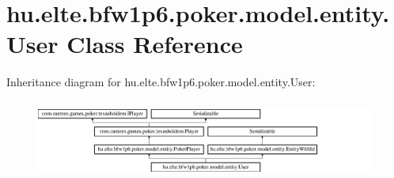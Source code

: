 \hypertarget{classhu_1_1elte_1_1bfw1p6_1_1poker_1_1model_1_1entity_1_1_user}{}\section{hu.\+elte.\+bfw1p6.\+poker.\+model.\+entity.\+User Class Reference}
\label{classhu_1_1elte_1_1bfw1p6_1_1poker_1_1model_1_1entity_1_1_user}
Inheritance diagram for hu.\+elte.\+bfw1p6.\+poker.\+model.\+entity.\+User\+:\begin{figure}[H]
\begin{center}
\leavevmode
\includegraphics[height=2.629108cm]{classhu_1_1elte_1_1bfw1p6_1_1poker_1_1model_1_1entity_1_1_user}
\end{center}
\end{figure}
